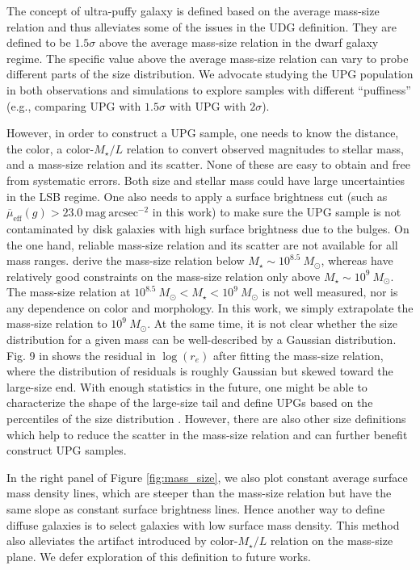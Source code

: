 \documentclass[twocolumn,astrosymb,twocolappendix]{aastex631}
\newcommand{\sbunit}{\mathrm{mag\ arcsec}^{-2}}
\newcommand{\sbeff}{\overline{\mu}_{\mathrm{eff}}(g)}
\begin{document}
\begin{CJK*}{UTF8}{gbsn}
The concept of ultra-puffy galaxy is defined based on the average mass-size relation and thus alleviates some of the issues in the UDG definition. They are defined to be $1.5\sigma$ above the average mass-size relation in the dwarf galaxy regime. The specific value above the average mass-size relation can vary to probe different parts of the size distribution. We advocate studying the UPG population in both observations and simulations to explore samples with different ``puffiness'' (e.g., comparing UPG with $1.5\sigma$ with UPG with $2\sigma$). 


However, in order to construct a UPG sample, one needs to know the distance, the color, a color-$M_\star/L$ relation to convert observed magnitudes to stellar mass, and a mass-size relation and its scatter. None of these are easy to obtain and free from systematic errors. Both size and stellar mass could have large uncertainties in the LSB regime. One also needs to apply a surface brightness cut (such as $\sbeff > 23.0\ \sbunit$ in this work) to make sure the UPG sample is not contaminated by disk galaxies with high surface brightness due to the bulges. On the one hand, reliable mass-size relation and its scatter are not available for all mass ranges. \citet{ELVES-I} derive the mass-size relation below $M_\star \sim 10^{8.5}\ M_\odot$, whereas \citet{Lange2015} have relatively good constraints on the mass-size relation only above $M_\star \sim 10^{9}\ M_\odot$. The mass-size relation at $10^{8.5}\ M_\odot < M_\star < 10^{9}\ M_\odot$ is not well measured, nor is any dependence on color and morphology. In this work, we simply extrapolate the \citet{ELVES-I} mass-size relation to $10^9\ M_\odot$. At the same time, it is not clear whether the size distribution for a given mass can be well-described by a Gaussian distribution. Fig. 9 in \citet{ELVES-I} shows the residual in $\log(r_e)$ after fitting the mass-size relation, where the distribution of residuals is roughly Gaussian but skewed toward the large-size end. With enough statistics in the future, one might be able to characterize the shape of the large-size tail and define UPGs based on the percentiles of the size distribution \citep{Greene2022}. However, there are also other size definitions which help to reduce the scatter in the mass-size relation \citep[e.g.,][]{Miller2019,Mowla2019,Trujillo2020,Chamba2022} and can further benefit construct UPG samples. 

In the right panel of Figure \ref{fig:mass_size}, we also plot constant average surface mass density lines, which are steeper than the mass-size relation but have the same slope as constant surface brightness lines. Hence another way to define diffuse galaxies is to select galaxies with low surface mass density. This method also alleviates the artifact introduced by color-$M_\star/L$ relation on the mass-size plane. We defer exploration of this definition to future works.  



\end{CJK*}
\end{document}
